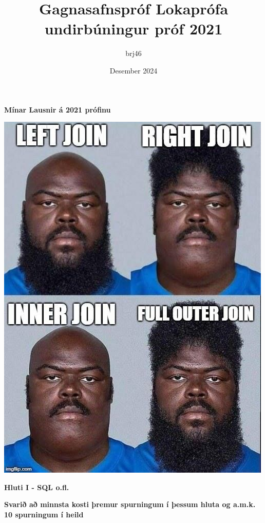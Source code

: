 \documentclass{article}
\title{Gagnasafnspróf Lokaprófa undirbúningur próf 2021}
\author{brj46 }
\date{Desember 2024}
\newcommand{\bo}[1]{\textbf{#1}}
\begin{document}
\maketitle

\begin{center}
\LARGE{\textbf{Mínar Lausnir á 2021 prófinu}}
\end{center}


\vspace{2cm}

\begin{center}
\includegraphics[scale = 0.5]{myndir/join.jpg}
\end{center}

\newpage

\begin{center}
    \bo{Hluti I - SQL o.fl.}
\end{center}

\bo{Svarið að minnsta kosti þremur spurningum í þessum hluta og a.m.k. 10 spurningum í heild}
\end{document}
